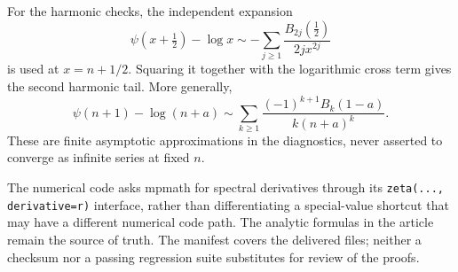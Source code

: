 \documentclass[11pt,letterpaper]{article}
\numberwithin{equation}{section}
\theoremstyle{definition}
\theoremstyle{remark}
\begin{document}
For the harmonic checks, the independent expansion
\begin{equation}
 \psi(x+\tfrac12)-\log x
       \sim-\sum_{j\geq1}\frac{B_{2j}(\tfrac12)}{2j x^{2j}}
 \label{dr:eq:digamma-tail}
\end{equation}
is used at $x=n+1/2$. Squaring it together with the logarithmic cross term
gives the second harmonic tail. More generally,
\begin{equation}
 \psi(n+1)-\log(n+a)
 \sim\sum_{k\geq1}\frac{(-1)^{k+1}B_k(1-a)}{k(n+a)^k}.
 \label{dr:eq:shifted-digamma-tail}
\end{equation}
These are finite asymptotic approximations in the diagnostics, never
asserted to converge as infinite series at fixed $n$.

The numerical code asks mpmath for spectral derivatives through its
\texttt{zeta(..., derivative=r)} interface, rather than differentiating
a special-value shortcut that may have a different numerical code path.
The analytic formulas in the article remain the source of truth.
The manifest covers the delivered files; neither a checksum nor a passing
regression suite substitutes for review of the proofs.
\end{document}
